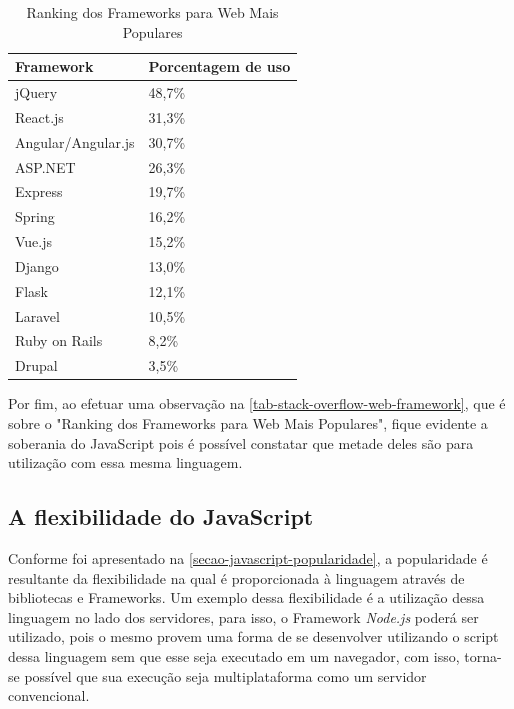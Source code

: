 \begin{table}[htb]
\ABNTEXfontereduzida
\caption[Ranking dos Frameworks para Web Mais Populares]{Ranking dos Frameworks para Web Mais Populares}
\label{tab-stack-overflow-web-framework}
\begin{tabular}{p{5cm}|p{4cm}}
   \textbf{Framework} & \textbf{Porcentagem de uso}  \\
    \hline
    jQuery & 48,7\%  \\
    \hline
    React.js & 31,3\%  \\
    \hline
    Angular/Angular.js & 30,7\%  \\
    \hline
    ASP.NET & 26,3\%  \\
    \hline
    Express & 19,7\%  \\
    \hline
    Spring & 16,2\%  \\
    \hline
    Vue.js & 15,2\%  \\
    \hline
    Django & 13,0\%  \\
    \hline
    Flask & 12,1\%  \\
    \hline
    Laravel & 10,5\%  \\
    \hline
    Ruby on Rails & 8,2\%  \\
    \hline
    Drupal & 3,5\%  \\
\end{tabular}
\end{table}

\newpage
Por fim, ao efetuar uma observação na \autoref{tab-stack-overflow-web-framework}, que é sobre o "Ranking dos Frameworks para Web Mais Populares", fique evidente a soberania do JavaScript pois é possível constatar que metade deles são para utilização com essa mesma linguagem.

\subsection{A flexibilidade do JavaScript}
\label{sec-javascript-flexibilidade}

Conforme foi apresentado na \autoref{secao-javascript-popularidade}, a popularidade é resultante da flexibilidade na qual é proporcionada à linguagem através de bibliotecas e Frameworks. Um exemplo dessa flexibilidade é a utilização dessa linguagem no lado dos servidores, para isso, o Framework \textit{Node.js} poderá ser utilizado, pois o mesmo provem uma forma de se desenvolver utilizando o script dessa linguagem sem que esse seja executado em um navegador, com isso, torna-se possível que sua execução seja multiplataforma como um servidor convencional.

